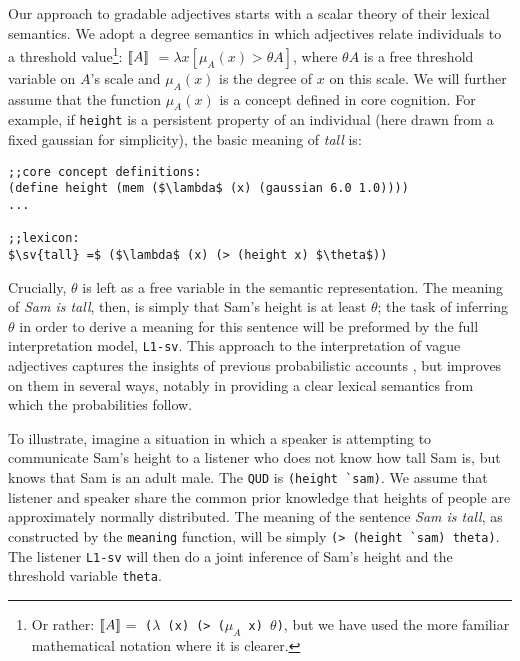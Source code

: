 \documentclass[12pt]{article}
\newcommand{\llbracket}{\ensuremath{\left [\!\left [}}%
\newcommand{\rrbracket}{\ensuremath{\right ]\!\right ]}}
\providecommand{\sv}[1]{\ensuremath{\llbracket #1 \rrbracket}}
\newcommand{\lar}[1]{\ensuremath{\langle #1 \rangle}}
\newcounter{definition}
\begin{document}
Our approach to gradable adjectives starts with a scalar theory of their lexical semantics. 
We adopt a degree semantics in which adjectives relate individuals to a threshold value\footnote{Or rather: \sv{A}${=}$ \texttt{($\lambda$ (x) (> ($\mu_A$ x) $\theta$)}, but we have used the more familiar mathematical notation where it is clearer.}: \sv{A} $= \lambda x [ \mu_A(x) > \theta{A}]$, where $\theta{A}$ is a free threshold variable on $A$'s scale and $\mu_A(x)$ is the degree of $x$ on this scale. We will further assume that the function $\mu_A(x)$ is a concept defined in core cognition. For example, if \lstinline{height} is a persistent property of an individual (here drawn from a fixed gaussian for simplicity), the basic meaning of \emph{tall} is:
\begin{lstlisting}[mathescape]
;;core concept definitions:
(define height (mem ($\lambda$ (x) (gaussian 6.0 1.0))))
...

;;lexicon:
$\sv{tall} =$ ($\lambda$ (x) (> (height x) $\theta$))
\end{lstlisting}
%
Crucially, $\theta$ is left as a free variable in the semantic representation. The meaning of \emph{Sam is tall}, then, is simply that Sam's height is at least $\theta$; the task of inferring $\theta$ in order to derive a meaning for this sentence will be preformed by the full interpretation model, \lstinline{L1-sv}. This approach to the interpretation of vague adjectives captures the insights of previous probabilistic accounts \citep{edgington97,schmidtetal09,frazeebeaver10,lassiter11}, but improves on them in several ways, notably in providing a clear lexical semantics from which the probabilities follow.


To illustrate, imagine a situation in which a speaker is attempting to communicate Sam's height to a listener who does not know how tall Sam is, but knows that Sam is an adult male. The \lstinline{QUD} is \lstinline{(height `sam)}. We assume that listener and speaker share the common prior knowledge that heights of people are approximately normally distributed. The meaning of the sentence \emph{Sam is tall}, as constructed by the \lstinline{meaning} function, will be simply \lstinline[mathescape,keepspaces]{(> (height `sam) theta)}.
The listener \lstinline{L1-sv} will then do a joint inference of Sam's height and the threshold variable \lstinline{theta}.
\end{document}
